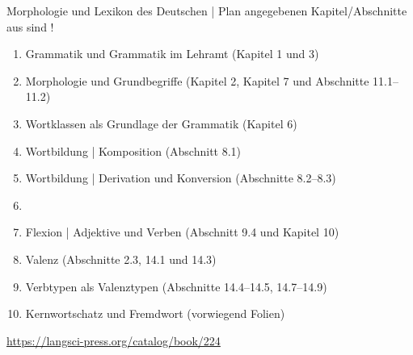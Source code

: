   \begin{frame}
    {Morphologie und Lexikon des Deutschen | Plan}
     angegebenen Kapitel\slash Abschnitte aus  sind !\\
    \Halbzeile
    \begin{enumerate}
      \item Grammatik und Grammatik im Lehramt (Kapitel 1 und 3)
      \item Morphologie und Grundbegriffe (Kapitel 2, Kapitel 7 und Abschnitte 11.1--11.2)
      \item Wortklassen als Grundlage der Grammatik (Kapitel 6)
      \item Wortbildung | Komposition (Abschnitt 8.1)
      \item Wortbildung | Derivation und Konversion (Abschnitte 8.2--8.3)
      \item {}
      \item Flexion | Adjektive und Verben (Abschnitt 9.4 und Kapitel 10)
      \item Valenz (Abschnitte 2.3, 14.1 und 14.3)
      \item Verbtypen als Valenztypen (Abschnitte 14.4--14.5, 14.7--14.9) 
      \item Kernwortschatz und Fremdwort (vorwiegend Folien)
    \end{enumerate}
    \Halbzeile
    \centering 
    \url{https://langsci-press.org/catalog/book/224}
  \end{frame}
\fi

